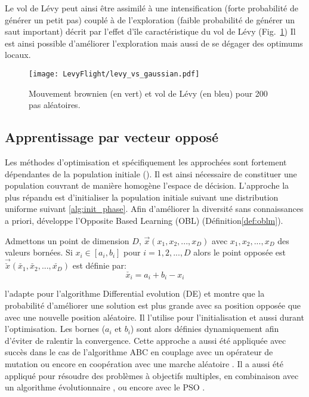Le vol de Lévy peut ainsi être assimilé à une intensification (forte probabilité de générer un petit pas)
couplé à de l’exploration (faible probabilité de générer un saut important) décrit par
l’effet d’île caractéristique du vol de Lévy (Fig.~\ref{fig:levy_vs_gaussian})
Il est ainsi possible d’améliorer l’exploration mais aussi de se dégager des optimums locaux.

\begin{figure}
    \begin{center}
        \texttt{[image: LevyFlight/levy\_vs\_gaussian.pdf]}
    \end{center}
    \caption{Mouvement brownien (en vert) et vol de Lévy (en bleu) pour 200 pas aléatoires.
             \label{fig:levy_vs_gaussian}}
\end{figure}
\FloatBarrier


\subsection{Apprentissage par vecteur opposé} %
\label{sub:apprentissage_par_vecteur_oppose}
Les méthodes d’optimisation et spécifiquement les approchées sont fortement
dépendantes de la population initiale (). Il est ainsi nécessaire
de constituer une population couvrant de manière homogène l’espace de décision.
L’approche la plus répandu est d’initialiser la population initiale suivant une
distribution uniforme suivant \eqref{alg:init_phase}.
Afin d’améliorer la diversité sans connaissances a priori,\cite{Tizhoosh2005695}
développe l’Opposite Based Learning (OBL) (Définition\ref{def:oblm}).

\begin{Def}\label{def:oblm}
Admettons un point de dimension $D$, $\vec{x}(x_{1}, x_{2}, ..., x_{D})$ avec
$x_{1}, x_{2}, ..., x_{D}$ des valeurs bornées. Si $x_{i} \in [a_{i}, b_{i}]$ pour
$i = 1, 2, ..., D$ alors le point opposée est $\vec{\check{x}}(\check{x_{1}}, \check{x_{2}}, ..., \check{x_{D}})$ est définie par:
\[\check{x_{i}} = a_{i} + b_{i} - x_{i}\]
\end{Def}

\cite{Rahnamayan2008906} l’adapte pour l’algorithme Differential evolution (DE)
et montre que la probabilité d’améliorer une solution est plus grande
avec sa position opposée que avec une nouvelle position aléatoire.
Il l’utilise pour l’initialisation et aussi durant l’optimisation. Les bornes
($a_{i}$ et $b_{i}$) sont alors définies dynamiquement afin d’éviter de ralentir la convergence.
Cette approche a aussi été appliquée avec succès dans le cas de l’algorithme ABC en couplage
avec un opérateur de mutation \parencite{Bi2011174} ou encore en coopération avec une marche
aléatoire \parencite{Sharma2012213}.
Il a aussi été appliqué pour résoudre des problèmes à objectifs multiples,
en combinaison avec un algorithme évolutionnaire \parencite{Ma201448}, ou encore avec le PSO \parencite{Gao2013114}.

